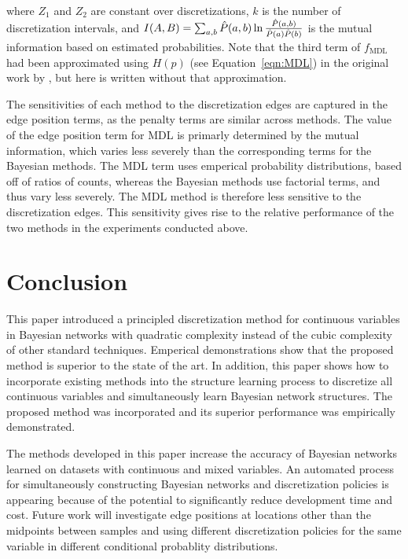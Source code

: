 \noindent
where $Z_1$ and $Z_2$ are constant over discretizations, $k$ is the number of discretization intervals, and $I\paren{A, B} = \sum_{a,b} \hat{P}(a,b) \ln\frac{\hat{P}(a,b)}{\hat{P}(a)\hat{P}(b)}$ is the mutual information based on estimated probabilities.
Note that the third term of $f_\text{MDL}$ had been approximated using $H(p)$ (see Equation~\ref{eqn:MDL}) in the original work by \cite{Friedman_1996}, but here is written without that approximation.

The sensitivities of each method to the discretization edges are captured in the edge position terms, as the penalty terms are similar across methods.
The value of the edge position term for MDL is primarly determined by the mutual information, which varies less severely than the corresponding terms for the Bayesian methods.
The MDL term uses emperical probability distributions, based off of ratios of counts, whereas the Bayesian methods use factorial terms, and thus vary less severely.
The MDL method is therefore less sensitive to the discretization edges.
This sensitivity gives rise to the relative performance of the two methods in the experiments conducted above.

\section{Conclusion}
This paper introduced a principled discretization method for continuous variables in Bayesian networks with quadratic complexity instead of the cubic complexity of other standard techniques.
Emperical demonstrations show that the proposed method is superior to the state of the art.
In addition, this paper shows how to incorporate existing methods into the structure learning process to discretize all continuous variables and simultaneously learn Bayesian network structures.
The proposed method was incorporated and its superior performance was empirically demonstrated.

The methods developed in this paper increase the accuracy of Bayesian networks learned on datasets with continuous and mixed variables.
An automated process for simultaneously constructing Bayesian networks and discretization policies is appearing because of the potential to significantly reduce development time and cost.
Future work will investigate edge positions at locations other than the midpoints between samples and using different discretization policies for the same variable in different conditional probablity distributions.

